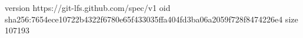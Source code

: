 version https://git-lfs.github.com/spec/v1
oid sha256:7654ece10722b4322f6780e65f433035ffa404fd3ba06a2059f728f8474226e4
size 107193
